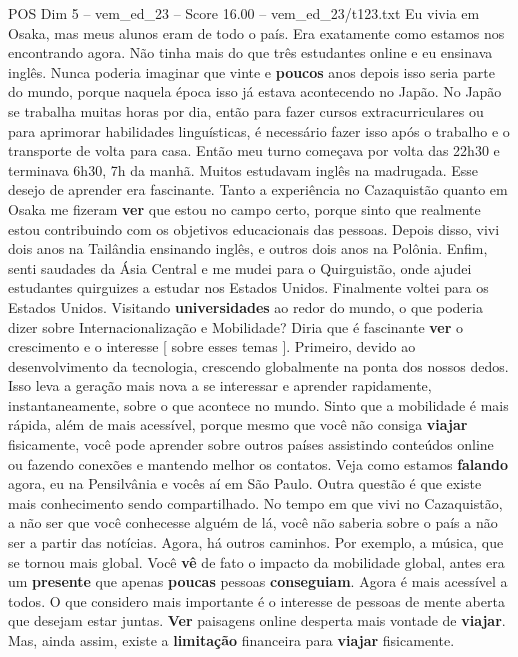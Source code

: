 \begin{textsample}{POS Dim 5 – vem\_ed\_23 – Score 16.00 – vem\_ed\_23/t123.txt}
Eu vivia em Osaka, mas meus alunos eram de todo o país.
Era exatamente como estamos nos encontrando agora.
Não tinha mais do que três estudantes online e eu ensinava inglês.
Nunca poderia imaginar que vinte e \textbf{poucos} anos depois isso seria parte do mundo, porque naquela época isso já estava acontecendo no Japão.
No Japão se trabalha muitas horas por dia, então para fazer cursos extracurriculares ou para aprimorar habilidades linguísticas, é necessário fazer isso após o trabalho e o transporte de volta para casa.
Então meu turno começava por volta das 22h30 e terminava 6h30, 7h da manhã.
Muitos estudavam inglês na madrugada.
Esse desejo de aprender era fascinante.
Tanto a experiência no Cazaquistão quanto em Osaka me fizeram \textbf{ver} que estou no campo certo, porque sinto que realmente estou contribuindo com os objetivos educacionais das pessoas.
Depois disso, vivi dois anos na Tailândia ensinando inglês, e outros dois anos na Polônia.
Enfim, senti saudades da Ásia Central e me mudei para o Quirguistão, onde ajudei estudantes quirguizes a estudar nos Estados Unidos.
Finalmente voltei para os Estados Unidos.
Visitando \textbf{universidades} ao redor do mundo, o que poderia dizer sobre Internacionalização e Mobilidade?
Diria que é fascinante \textbf{ver} o crescimento e o interesse [ sobre esses temas ].
Primeiro, devido ao desenvolvimento da tecnologia, crescendo globalmente na ponta dos nossos dedos.
Isso leva a geração mais nova a se interessar e aprender rapidamente, instantaneamente, sobre o que acontece no mundo.
Sinto que a mobilidade é mais rápida, além de mais acessível, porque mesmo que você não consiga \textbf{viajar} fisicamente, você pode aprender sobre outros países assistindo conteúdos online ou fazendo conexões e mantendo melhor os contatos.
Veja como estamos \textbf{falando} agora, eu na Pensilvânia e vocês aí em São Paulo.
Outra questão é que existe mais conhecimento sendo compartilhado.
No tempo em que vivi no Cazaquistão, a não ser que você conhecesse alguém de lá, você não saberia sobre o país a não ser a partir das notícias.
Agora, há outros caminhos.
Por exemplo, a música, que se tornou mais global.
Você \textbf{vê} de fato o impacto da mobilidade global, antes era um \textbf{presente} que apenas \textbf{poucas} pessoas \textbf{conseguiam}.
Agora é mais acessível a todos.
O que considero mais importante é o interesse de pessoas de mente aberta que desejam estar juntas. \textbf{Ver} paisagens online desperta mais vontade de \textbf{viajar}.
Mas, ainda assim, existe a \textbf{limitação} financeira para \textbf{viajar} fisicamente.

\end{textsample}
